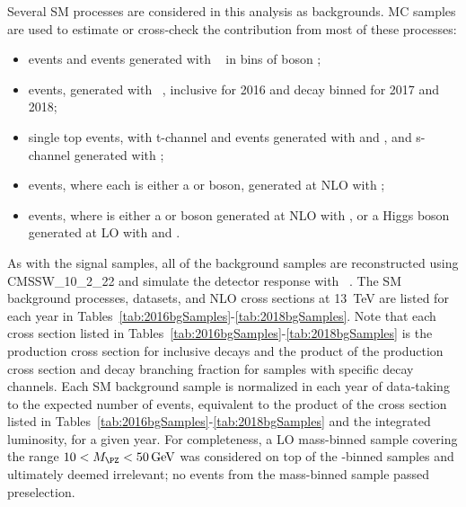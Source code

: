 Several SM processes are considered in this analysis as backgrounds. MC samples are used to estimate or cross-check the contribution from most of these processes:
\begin{itemize}
    \item \ZJETS events and \WJETS events generated with \MGvATNLO~\cite{MADGRAPH1,MADGRAPH2} in bins of boson \pt;
    \item \TTJETS events, generated with \POWHEG~\cite{POWHEG}, inclusive for 2016 and decay binned for 2017 and 2018;
    \item single top events, with t-channel and \Ptop\PW events generated with \PYTHIA and \POWHEG, and s-channel generated with \MGvATNLO;
    \item \VV events, where each \PV is either a \PW or \PZ boson, generated at NLO with \MGvATNLO;
    \item \TTV events, where \PV is either a \PW or \PZ boson generated at NLO with \MGvATNLO, or a Higgs boson generated at LO with \PYTHIA and \POWHEG.
\end{itemize}

As with the signal samples, all of the background samples are reconstructed using {CMSSW\_10\_2\_22} and simulate the detector response with \GEANTfour~\cite{GEANT4}. The SM background processes, datasets, and NLO cross sections at \SI{13}{\TeV} are listed for each year in Tables~\ref{tab:2016bgSamples}-\ref{tab:2018bgSamples}. Note that each cross section listed in Tables~\ref{tab:2016bgSamples}-\ref{tab:2018bgSamples} is the production cross section for inclusive decays and the product of the production cross section and decay branching fraction for samples with specific decay channels. Each SM background sample is normalized in each year of data-taking to the expected number of events, equivalent to the product of the cross section listed in Tables~\ref{tab:2016bgSamples}-\ref{tab:2018bgSamples} and the integrated luminosity, for a given year. For completeness, a LO mass-binned \ZJETS sample covering the range $\SI{10}{} < \MZ < \SI{50}{\GeV}$ was considered on top of the \pt-binned samples and ultimately deemed irrelevant; no events from the mass-binned sample passed preselection.

